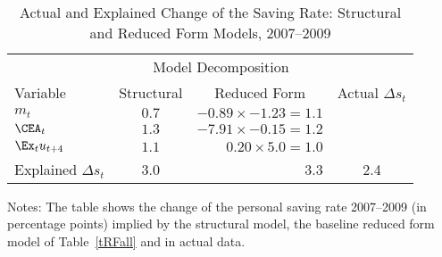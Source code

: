 \hypertarget{tPred}{}
\begin{table}[H]
\begin{center}
\caption{ Actual and Explained Change of the Saving Rate: Structural and Reduced Form Models, 2007--2009} \label{tGRdecomp}
\begin{tabular}{@{}lcrc@{}}\\
\toprule
      & \multicolumn{2}{c}{Model Decomposition}& \\
      \cmidrule(l){2-3}
     Variable & \multicolumn{1}{c}{Structural }& \multicolumn{1}{c}{Reduced Form }& \multicolumn{1}{c}{Actual $\Delta s_t$ }\\
\midrule
$m_t$ & $ 0.7 $ & $ -0.89 \times -1.23 = 1.1 $ & \\
$\CEA_t$ & $1.3 $ & $ -7.91 \times -0.15 = 1.2 $ &  \\
$\Ex_t u_{t+4} $ & $ 1.1 $ & $ 0.20 \times 5.0 = 1.0 $ & \\\midrule
Explained $\Delta s_t$ &  3.0 &  3.3 & 2.4\\
\bottomrule
\end{tabular}
\end{center}
 {\footnotesize Notes: The table shows the change of the personal saving rate 2007--2009 (in percentage points) implied by the structural model, the baseline reduced form model of Table~\ref{tRFall} and in actual data.}
\end{table}
